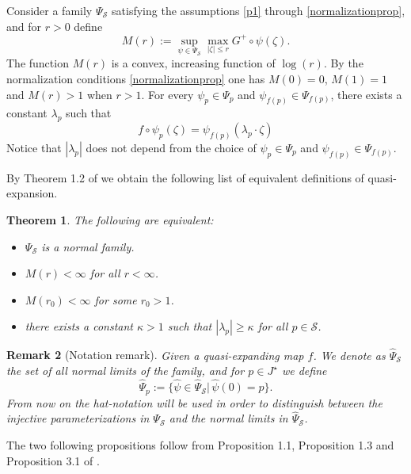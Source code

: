\documentclass[10pt,a4paper]{article}
\newtheorem{theorem}{Theorem}[section]
\newtheorem{remark}[theorem]{Remark}
\begin{document}
Consider a family $\Psi_{\mathcal{S}}$ satisfying the assumptions \eqref{p1} through \eqref{normalizationprop}, and for $r>0$ define
\begin{equation}
\label{capitalM}
M(r):=\sup_{\psi\in\Psi_\mathcal{S}}\max_{|\zeta|\leq r}G^+\circ \psi(\zeta).
\end{equation}
The function $M(r)$ is a convex, increasing function of $\log(r)$. By the normalization conditions \eqref{normalizationprop} one has $M(0)=0$, $M(1)=1$ and $M(r)>1$ when $r>1$.
For every $\psi_p\in \Psi_p$ and $\psi_{f(p)}\in\Psi_{f(p)}$, there exists a constant $\lambda_p$ such that%
\begin{equation}
\label{functionaleq}
f\circ\psi_p(\zeta)=\psi_{f(p)}(\lambda_p\cdot \zeta)
\end{equation}
Notice that $|\lambda_p|$ does not depend from the choice of $\psi_p\in\Psi_p$ and $\psi_{f(p)}\in\Psi_{f(p)}$.

By Theorem 1.2 of \cite{BS8} we obtain the following list of equivalent definitions of quasi-expansion.
\begin{theorem}
\label{equivalentdefquasihyp}
The following are equivalent:\begin{itemize}
\item[(i)] $\Psi_\mathcal S$ is a normal family.
\item [(ii)]$M(r)<\infty$ for all $r<\infty$.
\item[(iii)]$M(r_0)<\infty$ for some $r_0>1$.
\item[(iv)] there exists a constant $\kappa>1$ such that $|\lambda_p|\geq\kappa$ for all $p\in\mathcal S$.
\end{itemize}
\end{theorem}

\begin{remark}[Notation remark]
Given a quasi-expanding map $f$. We denote as $\widehat\Psi_\mathcal S$  the set of all normal limits of the family, and for $p \in J^\star$ we define
\[
\widehat\Psi_p:=\{\widehat\psi\in\widehat\Psi_\mathcal S|\,\widehat\psi(0)=p\}.
\]
From now on the hat-notation will be used in order to distinguish between the injective parameterizations in $\Psi_\mathcal S$ and the normal limits in $\widehat\Psi_\mathcal S$.
\end{remark}
The two following propositions follow from Proposition 1.1, Proposition 1.3 and Proposition 3.1 of \cite{BSh}.
\end{document}
